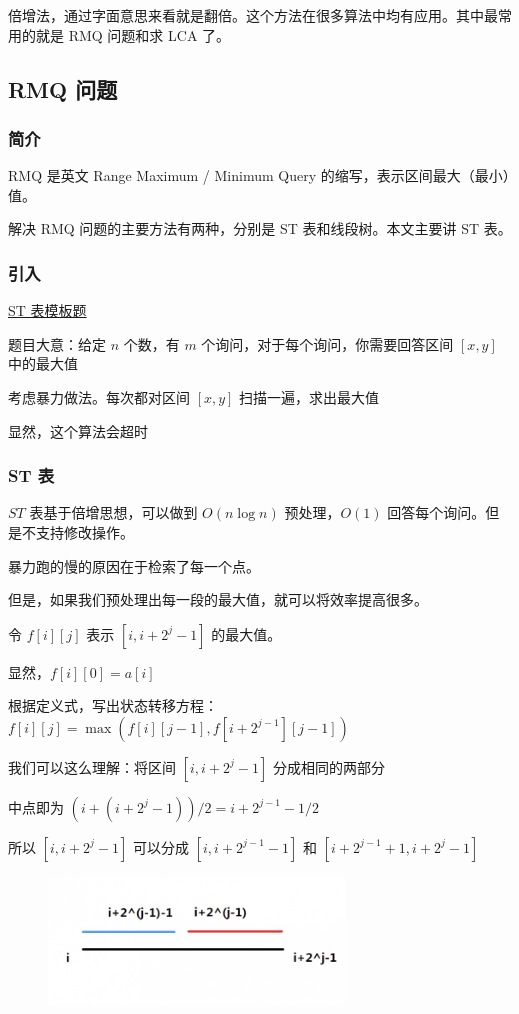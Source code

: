 
倍增法，通过字面意思来看就是翻倍。这个方法在很多算法中均有应用。其中最常用的就是 RMQ 问题和求 LCA 了。

\subsection{RMQ 问题}

\subsubsection{简介}

RMQ 是英文 Range Maximum / Minimum Query 的缩写，表示区间最大（最小）值。

解决 RMQ 问题的主要方法有两种，分别是 ST 表和线段树。本文主要讲 ST 表。

\subsubsection{引入}

\href{https://www.luogu.org/problemnew/show/P3865}{ST 表模板题}

题目大意：给定 $n$ 个数，有 $m$ 个询问，对于每个询问，你需要回答区间 $[x,y]$ 中的最大值

考虑暴力做法。每次都对区间 $[x,y]$ 扫描一遍，求出最大值

显然，这个算法会超时

\subsubsection{ST 表}

$ST$ 表基于倍增思想，可以做到 $O(n\log n)$ 预处理，$O(1)$ 回答每个询问。但是不支持修改操作。

暴力跑的慢的原因在于检索了每一个点。

但是，如果我们预处理出每一段的最大值，就可以将效率提高很多。

令 $f[i][j]$ 表示 $[i,i+2^j-1]$ 的最大值。

显然，$f[i][0]=a[i]$

根据定义式，写出状态转移方程：$f[i][j]=\max(f[i][j-1],f[i+2^{j-1}][j-1])$

我们可以这么理解：将区间 $[i,i+2^j-1]$ 分成相同的两部分

中点即为 $(i+(i+2^j-1))/2=i+2^{j-1}-1/2$

所以 $[i,i+2^j-1]$ 可以分成 $[i,i+2^{j-1}-1]$ 和 $[i+2^{j-1}+1,i+2^j-1]$

\begin{figure}[htbp]
\centering
\includegraphics[width=0.7\textwidth]{docs/ds/images/st1.png} 

\end{figure}


